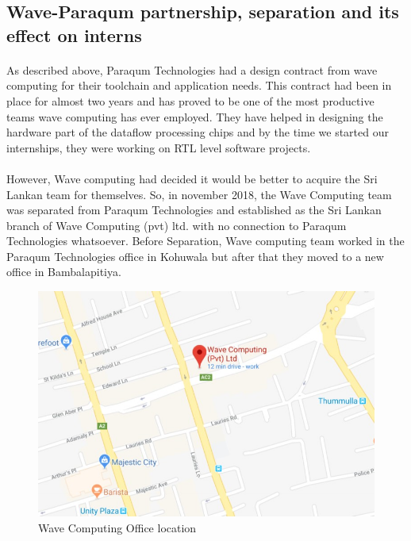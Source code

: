 \subsection{Wave-Paraqum partnership, separation and its effect on interns}

\paragraph{}
As described above, Paraqum Technologies had a design contract from wave computing for their toolchain and application needs. This contract had been in place for almost two years and has proved to be one of the most productive teams wave computing has ever employed. They have helped in designing the hardware part of the dataflow processing chips and by the time we started our internships, they were working on RTL level software projects.

\paragraph{}
However, Wave computing had decided it would be better to acquire the Sri Lankan team for themselves. So, in november 2018, the Wave Computing team was separated from Paraqum Technologies and established as the Sri Lankan branch of Wave Computing (pvt) ltd. with no connection to Paraqum Technologies whatsoever. Before Separation, Wave computing team worked in the Paraqum Technologies office in Kohuwala but after that they moved to a new office in Bambalapitiya.

\begin{figure}[H]
    \centering
    \includegraphics[trim=0cm 0cm 0cm 0cm, clip=true,scale=0.25]{figures/wave_location.jpg}
    \caption{Wave Computing Office location \label{Fig:pqmteam}}\vspace{-4mm}
    \end{figure}

